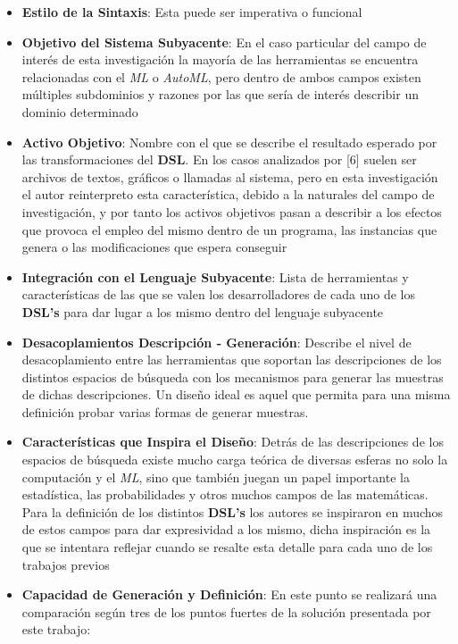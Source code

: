 \begin{itemize}
    \item {\bf Estilo de la Sintaxis}: Esta puede ser imperativa o funcional
    \item {\bf Objetivo del Sistema Subyacente}: En el caso particular del campo de interés de esta
          investigación la mayoría de las herramientas se encuentra relacionadas con el {\it ML} o
              {\it AutoML}, pero dentro de ambos campos existen múltiples subdominios y razones por las que
          sería de interés describir un dominio determinado
    \item {\bf Activo Objetivo}: Nombre con el que se describe el resultado esperado por las transformaciones
          del {\bf DSL}. En los casos analizados por [6] suelen ser archivos de textos, gráficos o llamadas
          al sistema, pero en esta investigación el autor reinterpreto esta característica, debido a la
          naturales del campo de investigación, y por tanto los activos objetivos pasan a describir a
          los efectos que provoca el empleo del mismo dentro de un programa, las instancias que
          genera o las modificaciones que espera conseguir
    \item {\bf Integración con el Lenguaje Subyacente}: Lista de herramientas y características de las
          que se valen los desarrolladores de cada uno de los {\bf DSL's} para dar lugar a los mismo dentro
          del lenguaje subyacente
    \item {\bf Desacoplamientos Descripción - Generación}: Describe el nivel de desacoplamiento entre
          las herramientas que soportan las descripciones de los distintos espacios de búsqueda con
          los mecanismos para generar las muestras de dichas descripciones. Un diseño ideal
          es aquel que permita para una misma definición probar varias formas de generar muestras.
    \item {\bf Características que Inspira el Diseño}: Detrás de las descripciones de los espacios de
          búsqueda existe mucho carga teórica de diversas esferas no solo la computación y el {\it ML},
          sino que también juegan un papel importante la estadística, las probabilidades y otros muchos
          campos de las matemáticas. Para la definición de los distintos {\bf DSL's} los autores se inspiraron
          en muchos de estos campos para dar expresividad a los mismo, dicha inspiración es la que se
          intentara reflejar cuando se resalte esta detalle para cada uno de los trabajos previos
    \item {\bf Capacidad de Generación y Definición}: En este punto se realizará una comparación según tres
          de los puntos fuertes de la solución presentada por este trabajo:
          \begin{itemize}


\end{itemize}
\end{itemize}
